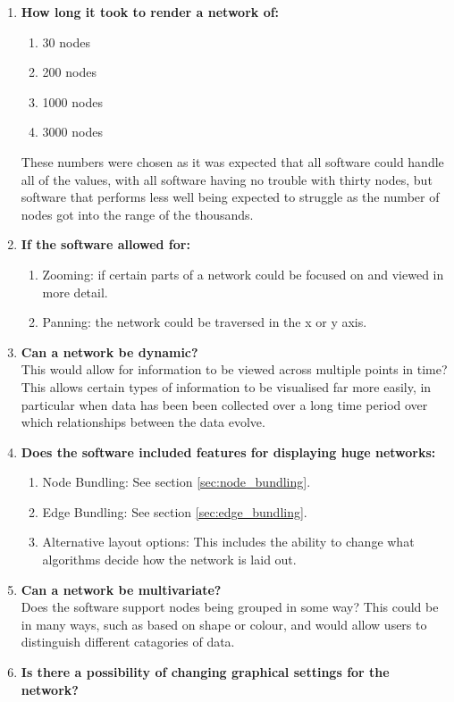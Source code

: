 \documentclass[../dissertation.tex]{subfiles}
\begin{document}
\begin{enumerate}
	\item \textbf{How long it took to render a network of:}
	\begin{enumerate}
	    \item 30 nodes
	    \item 200 nodes
	    \item 1000 nodes
	    \item 3000 nodes
	\end{enumerate}
	These numbers were chosen as it was expected that all software could handle all of the values, with all software having no trouble with thirty nodes, but software that performs less well being expected to struggle as the number of nodes got into the range of the thousands. 
	\item \textbf{If the software allowed for:}
	\begin{enumerate}
		\item Zooming: if certain parts of a network could be focused on and viewed in more detail.
		\item Panning: the network could be traversed in the x or y axis.
	\end{enumerate}
	\item \textbf{Can a network be dynamic?}\\
	This would allow for information to be viewed across multiple points in time? This allows certain types of information to be visualised far more easily, in particular when data has been been collected over a long time period over which relationships between the data evolve.
	\item \textbf{Does the software included features for displaying huge networks:}
	\begin{enumerate} 
		\item Node Bundling: See section \ref{sec:node_bundling}.
		\item Edge Bundling: See section \ref{sec:edge_bundling}.
		\item Alternative layout options: This includes the ability to change what algorithms decide how the network is laid out.
	\end{enumerate}
	\item \textbf{Can a network be multivariate?}\\
	Does the software support nodes being grouped in some way? This could be in many ways, such as based on shape or colour, and would allow users to distinguish different catagories of data.
	\item \textbf{Is there a possibility of changing graphical settings for the network?}\\

\end{enumerate}
\end{document}
